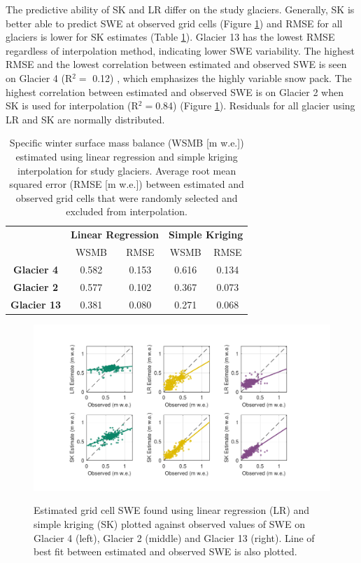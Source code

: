 \documentclass[twocolumn,letterpaper]{igs}
\begin{document}
The predictive ability of SK and LR differ on the study glaciers. Generally, SK is better able to predict SWE at observed grid cells (Figure \ref{fig:observedVSestimated_S2}) and RMSE for all glaciers is lower for SK estimates (Table \ref{tab:WSMB&RMSE}). Glacier 13 has the lowest RMSE regardless of interpolation method, indicating lower SWE variability. The highest RMSE and the lowest correlation between estimated and observed SWE is seen on Glacier 4 (R$^2=$ 0.12) , which emphasizes the highly variable snow pack.  The highest correlation between estimated and observed SWE is on Glacier 2 when SK is used for interpolation (R$^2=$0.84) (Figure \ref{fig:observedVSestimated_S2}). Residuals for all glacier using LR and SK are normally distributed.

\begin{table}[]
\centering
\caption{Specific winter surface mass balance (WSMB [m w.e.]) estimated using linear regression and simple kriging interpolation for study glaciers. Average root mean squared error (RMSE [m w.e.]) between estimated and observed grid cells that were randomly selected and excluded from interpolation.}
\label{tab:WSMB&RMSE}
\begin{tabular}{ccccc}
 & \multicolumn{2}{c}{\textbf{Linear Regression}} & \multicolumn{2}{c}{\textbf{Simple Kriging}} \\
 & WSMB & RMSE & WSMB & RMSE \\
  \midrule
\textbf{Glacier 4} & 0.582 & 0.153 & 0.616 & 0.134 \\
 \midrule
\textbf{Glacier 2} & 0.577 & 0.102 & 0.367 & 0.073 \\
 \midrule
\textbf{Glacier 13} & 0.381 & 0.080 & 0.271 & 0.068
\end{tabular}
\end{table}

\begin{figure}
	\centering
	\includegraphics[width =\textwidth]{observedVSestimated_S2.pdf}\\
	\caption{Estimated grid cell SWE found using linear regression (LR) and simple kriging (SK) plotted against observed values of SWE on Glacier 4 (left), Glacier 2 (middle) and Glacier 13 (right). Line of best fit between estimated and observed SWE is also plotted.}
	\label{fig:observedVSestimated_S2}
\end{figure}
\end{document}
